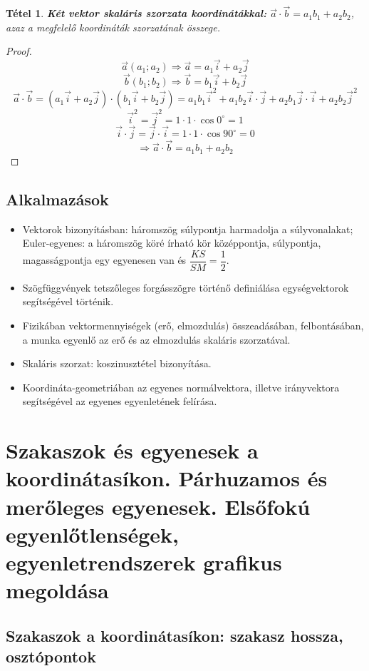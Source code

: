 \documentclass[12pt,a4paper]{article}
\newtheorem{theorem}{Tétel} [section]
\begin{document}
\begin{theorem}
\textbf{Két vektor skaláris szorzata koordinátákkal:} $\vec{a}\cdot\vec{b}=a_1b_1+a_2b_2$, azaz a megfelelő koordináták szorzatának összege.
\end{theorem}
\begin{proof}
\[\vec{a}(a_1;a_2)\Rightarrow \vec{a}=a_1\vec{i}+a_2\vec{j}\]
\[\vec{b}(b_1;b_2)\Rightarrow \vec{b}=b_1\vec{i}+b_2\vec{j}\]
\[\vec{a}\cdot\vec{b}=(a_1\vec{i}+a_2\vec{j})\cdot(b_1\vec{i}+b_2\vec{j})=a_1b_1\vec{i}^2+a_1b_2\vec{i}\cdot\vec{j}+a_2b_1\vec{j}\cdot\vec{i}+a_2b_2\vec{j}^2\]
\[\vec{i}^2=\vec{j}^2=1\cdot 1\cdot \cos 0^\circ =1\]
\[\vec{i}\cdot\vec{j}=\vec{j}\cdot\vec{i}=1\cdot 1 \cdot \cos 90^\circ =0\]
\[\Rightarrow \vec{a}\cdot\vec{b}=a_1b_1+a_2b_2\]
\end{proof}

\subsection{Alkalmazások}
\begin{itemize}
\item Vektorok bizonyításban: háromszög súlypontja harmadolja a súlyvonalakat; Euler-egyenes: a háromszög köré írható kör középpontja, súlypontja, magasságpontja egy egyenesen van és $\dfrac{KS}{SM}=\dfrac{1}{2}$.
\item Szögfüggvények tetszőleges forgásszögre történő definiálása egységvektorok segítségével történik.
\item Fizikában vektormennyiségek (erő, elmozdulás) összeadásában, felbontásában, a munka egyenlő az erő és az elmozdulás skaláris szorzatával.
\item Skaláris szorzat: koszinusztétel bizonyítása.
\item Koordináta-geometriában az egyenes normálvektora, illetve irányvektora segítségével az egyenes egyenletének felírása.
\end{itemize}

\newpage



\section{Szakaszok és egyenesek a koordinátasíkon. Párhuzamos és merőleges egyenesek. Elsőfokú egyenlőtlenségek, egyenletrendszerek grafikus megoldása}

\subsection{Szakaszok a koordinátasíkon: szakasz hossza, osztópontok}
\end{document}
